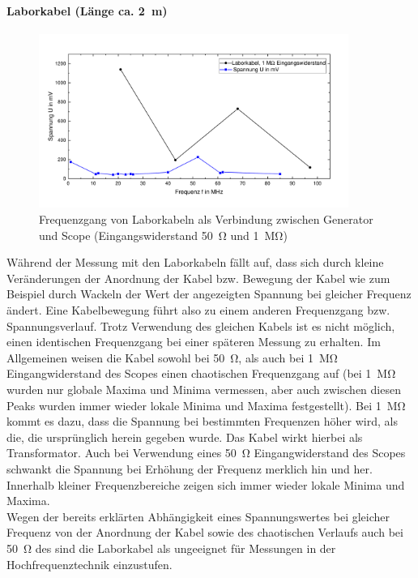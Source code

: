 \documentclass[a4paper,twoside,final]{article}
\begin{document}
\paragraph{Laborkabel (Länge ca. \SI{2}{\meter})}

\begin{figure}[h]
    \centering
        \includegraphics[width=0.9\textwidth]{Bilder/Laborkabel_50_1MOhm.pdf}
    \caption{Frequenzgang von Laborkabeln als Verbindung zwischen Generator und Scope (Eingangswiderstand \SI{50}{\ohm} und \SI{1}{\mega\ohm}) }
\end{figure}

Während der Messung mit den Laborkabeln fällt auf, dass sich durch kleine Veränderungen der Anordnung der Kabel bzw. Bewegung der Kabel wie zum Beispiel durch Wackeln der Wert der angezeigten Spannung bei gleicher Frequenz ändert. Eine Kabelbewegung führt also zu einem anderen Frequenzgang bzw. Spannungsverlauf. Trotz Verwendung des gleichen Kabels ist es nicht möglich, einen identischen Frequenzgang bei einer späteren Messung zu erhalten.
Im Allgemeinen weisen die Kabel sowohl bei \SI{50}{\ohm}, als auch bei \SI{1}{\mega\ohm} Eingangwiderstand des Scopes einen chaotischen Frequenzgang auf (bei \SI{1}{\mega\ohm} wurden nur globale Maxima und Minima vermessen, aber auch zwischen diesen Peaks wurden immer wieder lokale Minima und Maxima festgestellt). Bei \SI{1}{\mega\ohm} kommt es dazu, dass die Spannung bei bestimmten Frequenzen höher wird, als die, die ursprünglich herein gegeben wurde. Das Kabel wirkt hierbei als Transformator.
Auch bei Verwendung eines \SI{50}{\ohm} Eingangwiderstand des Scopes schwankt die Spannung bei Erhöhung der Frequenz merklich hin und her. Innerhalb kleiner Frequenzbereiche zeigen sich immer wieder lokale Minima und Maxima.\\
Wegen der bereits erklärten Abhängigkeit eines Spannungswertes bei gleicher Frequenz von der Anordnung der Kabel sowie des chaotischen Verlaufs auch bei \SI{50}{\ohm} des sind die Laborkabel als ungeeignet für Messungen in der Hochfrequenztechnik einzustufen.\\
\end{document}
